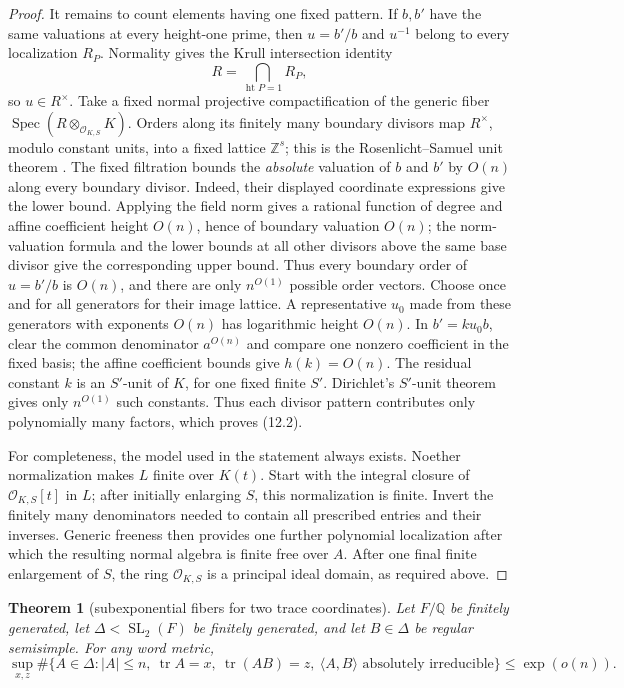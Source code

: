 \documentclass[11pt,reqno]{amsart}
\newtheorem{theorem}{Theorem}[section]
\theoremstyle{definition}
\theoremstyle{remark}
\newcommand{\Q}{\mathbb Q}
\newcommand{\Z}{\mathbb Z}
\newcommand{\cO}{\mathcal O}
\newcommand{\Tr}{\operatorname{tr}}
\newcommand{\SL}{\operatorname{SL}}
\begin{document}
\begin{proof}
It remains to count elements having one fixed pattern.  If \(b,b'\) have the
same valuations at every height-one prime, then \(u=b'/b\) and \(u^{-1}\)
belong to every localization \(R_P\).  Normality gives the Krull intersection
identity
\[
 R=\bigcap_{\operatorname{ht}P=1}R_P,
\]
so \(u\in R^\times\).  Take a fixed normal projective compactification of
the generic fiber
\(\operatorname{Spec}(R\otimes_{\cO_{K,S}}K)\).  Orders along its finitely
many boundary divisors map \(R^\times\), modulo constant units, into a fixed
lattice \(\Z^s\); this is the Rosenlicht--Samuel unit theorem
\cite{Rosenlicht,SamuelUnits}.  The fixed
filtration bounds the \emph{absolute} valuation of \(b\) and \(b'\) by
\(O(n)\) along every boundary divisor.  Indeed, their displayed coordinate
expressions give the lower bound.  Applying the field norm gives a rational
function of degree and affine coefficient height \(O(n)\), hence of boundary
valuation \(O(n)\); the norm-valuation formula and the lower bounds at all
other divisors above the same base divisor give the corresponding upper
bound.  Thus every boundary order of \(u=b'/b\) is \(O(n)\), and there are
only \(n^{O(1)}\) possible order vectors.  Choose once and for all generators
for their image lattice.  A representative \(u_0\) made from these
generators with exponents \(O(n)\) has logarithmic height \(O(n)\).  In
\(b'=k u_0b\), clear the common denominator \(a^{O(n)}\) and compare one
nonzero coefficient in the fixed basis; the affine coefficient bounds give
\(h(k)=O(n)\).  The residual constant \(k\) is an \(S'\)-unit of \(K\), for
one fixed finite \(S'\).
Dirichlet's \(S'\)-unit theorem
\cite[Chapter~I, Sections~7 and~11]{Neukirch} gives only
\(n^{O(1)}\) such constants.
Thus each divisor pattern contributes only polynomially many factors, which
proves (12.2).

For completeness, the model used in the statement always exists.  Noether
normalization makes \(L\) finite over \(K(t)\).  Start with the integral
closure of \(\cO_{K,S}[t]\) in \(L\); after initially enlarging \(S\), this
normalization is finite.  Invert the finitely many denominators needed to
contain all prescribed entries and their inverses.  Generic freeness then
provides one further polynomial localization after which the resulting
normal algebra is finite free over \(A\).  After one final finite enlargement
of \(S\), the ring \(\cO_{K,S}\) is a principal ideal domain, as required
above.
\end{proof}

\begin{theorem}[subexponential fibers for two trace coordinates]\label{thm:finite-type-fiber}
Let \(F/\Q\) be finitely generated, let
\(\Delta<\SL_2(F)\) be finitely generated, and let \(B\in\Delta\) be regular
semisimple.  For any word metric,
\[
 \sup_{x,z}
 \#\{A\in\Delta:|A|\le n,\ \Tr A=x,\ \Tr(AB)=z,\
       \langle A,B\rangle\text{ absolutely irreducible}\}
 \le\exp(o(n)).
\tag{12.5}
\]
\end{theorem}
\end{document}
